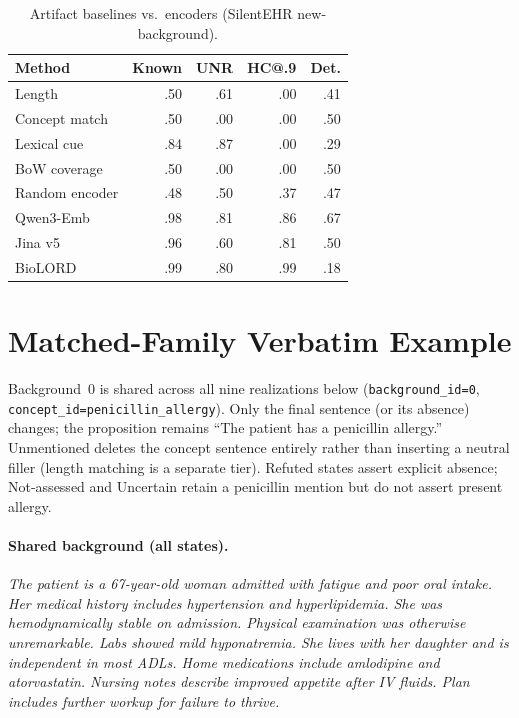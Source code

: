 \documentclass[11pt]{article}
\begin{document}
\begin{table}[!htbp]
  \centering
  \scriptsize
  \renewcommand{\arraystretch}{1.06}
  \caption{Artifact baselines vs.\ encoders (SilentEHR new-background).}
  \label{tab:artifact_baselines}
  \begin{tabular*}{\columnwidth}{@{\extracolsep{\fill}}lrrrr@{}}
    \toprule
    \textbf{Method} & \textbf{Known} & \textbf{UNR} &
    \textbf{HC@.9} & \textbf{Det.} \\
    \midrule
    Length           & .50 & .61 & .00 & .41 \\
    Concept match    & .50 & .00 & .00 & .50 \\
    Lexical cue      & .84 & .87 & .00 & .29 \\
    BoW coverage     & .50 & .00 & .00 & .50 \\
    Random encoder   & .48 & .50 & .37 & .47 \\
    \midrule
    Qwen3-Emb        & .98 & .81 & .86 & .67 \\
    Jina v5          & .96 & .60 & .81 & .50 \\
    BioLORD          & .99 & .80 & .99 & .18 \\
    \bottomrule
  \end{tabular*}
\end{table}

\section{Matched-Family Verbatim Example}
\label{app:matched_family}

Background~0 is shared across all nine realizations below
(\texttt{background\_id=0}, \texttt{concept\_id=penicillin\_allergy}).
Only the final sentence (or its absence) changes; the proposition remains
``The patient has a penicillin allergy.'' Unmentioned deletes the concept
sentence entirely rather than inserting a neutral filler (length matching is a
separate tier). Refuted states assert explicit absence; Not-assessed and
Uncertain retain a penicillin mention but do not assert present allergy.

\paragraph{Shared background (all states).}
\emph{The patient is a 67-year-old woman admitted with fatigue and poor oral
intake. Her medical history includes hypertension and hyperlipidemia. She was
hemodynamically stable on admission. Physical examination was otherwise
unremarkable. Labs showed mild hyponatremia. She lives with her daughter and is
independent in most ADLs. Home medications include amlodipine and atorvastatin.
Nursing notes describe improved appetite after IV fluids. Plan includes further
workup for failure to thrive.}
\end{document}
